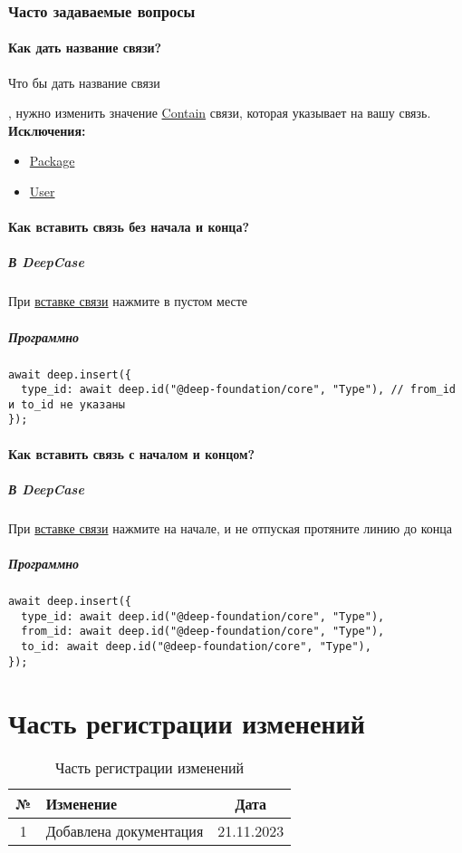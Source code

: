 \documentclass{article}
\begin{document}
\subsubsection{Часто задаваемые вопросы}
\paragraph{Как дать название связи?}
\hypertarget{FAQ.HowToSetName}{Что бы дать название связи}, нужно изменить
значение \hyperlink{Core.Contain.Description}{Contain} связи, которая указывает
на вашу
связь. \\
\textbf{Исключения:}
\begin{itemize}
      \item \hyperlink{Core.Package.Description}{Package}
      \item \hyperlink{Core.Package.Description}{User}
\end{itemize}
\paragraph{Как вставить связь без начала и
      конца?}\hypertarget{FAQ.HowToInsertLinkWithoutFromAndTo}{}
\subparagraph{В DeepCase}
При \hyperlink{DeepCase.InsertLink.Description}{вставке связи} нажмите в пустом
месте
\subparagraph{Программно}
\begin{verbatim}
await deep.insert({
  type_id: await deep.id("@deep-foundation/core", "Type"), // from_id и to_id не указаны
});
\end{verbatim}
\paragraph{Как вставить связь с началом и
      концом?}\hypertarget{FAQ.HowToInsertLinkWithFromAndTo}{}
\subparagraph{В DeepCase}
При \hyperlink{DeepCase.InsertLink.Description}{вставке связи} нажмите на
начале, и не отпуская протяните линию до конца
\subparagraph{Программно}
\begin{verbatim}
await deep.insert({
  type_id: await deep.id("@deep-foundation/core", "Type"),
  from_id: await deep.id("@deep-foundation/core", "Type"),
  to_id: await deep.id("@deep-foundation/core", "Type"),
});
\end{verbatim}

\section{Часть регистрации изменений}

\begin{table}[h]
      \centering
      \caption{Часть регистрации изменений}
      \begin{tabular}{|c|p{8cm}|c|}
            \hline
            \textbf{№} & \textbf{Изменение}     & \textbf{Дата} \\
            \hline
            1          & Добавлена документация & 21.11.2023    \\
            \hline
      \end{tabular}
\end{table}
\end{document}
